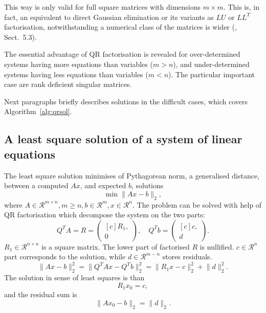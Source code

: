 \begin{refsection}
This way is only valid for full square matrices with dimensions
$m \times m$. This is, in fact, an equivalent to direct Gaussian elimination
or its variants as $LU$ or $LL^T$ factorisation, notwithstanding
a numerical class of the matrices is wider (\cite{golub2013matrix}, Sect.~5.3).

The essential advantage of QR factorisation is revealed for
over-determined systems having more equations than variables ($m > n$),
and under-determined systems having less equations than variables ($m < n$).
The particular important case are rank deficient singular matrices.

Next paragraphs briefly describes solutions in the difficult cases,
which covers Algorithm~\ref{alg:qrsol}.


\subsection{A least square solution of a system of linear equations}
\label{sec:lsqrt}

The least square solution minimises of Pythagorean norm,
a generalised distance, between a computed $Ax$, and expected $b$,
solutions
\begin{equation}
  \min \lVert A x - b \rVert_2,
\end{equation}
where $A \in \mathcal{R}^{m \times n}, m \ge n, b \in \mathcal{R}^m,
x \in \mathcal{R}^n$.
The problem can be solved with help of QR factorisation which decompose
the system on the two parts:
\begin{equation}
  Q^T A = R =
  \begin{pmatrix*}[c]
    R_1,\\
    0
  \end{pmatrix*},
  \quad Q^T b =
  \begin{pmatrix*}[c]
    c,\\
    d
  \end{pmatrix*}.
\end{equation}
$R_1 \in \mathcal{R}^{n \times n}$ is a square matrix. The lower part
of factorised $R$ is nullified. $c \in \mathcal{R}^n$ part corresponds
to the solution, while $d \in \mathcal{R}^{m-n}$ stores residuals.
\begin{equation}
  \lVert A x - b \rVert_2^2 = \lVert Q^T A x - Q^T b \rVert_2^2 =
  \lVert R_1 x - c \rVert_2^2 + \lVert d \rVert_2^2.
\end{equation}
The solution in sense of least squares is than
\begin{equation}
  R_1 x_0 = c,
\end{equation}
and the residual sum is
\begin{equation}
\lVert Ax_0 - b \rVert_2 = \lVert d \rVert_2.
\end{equation}




\end{refsection}
